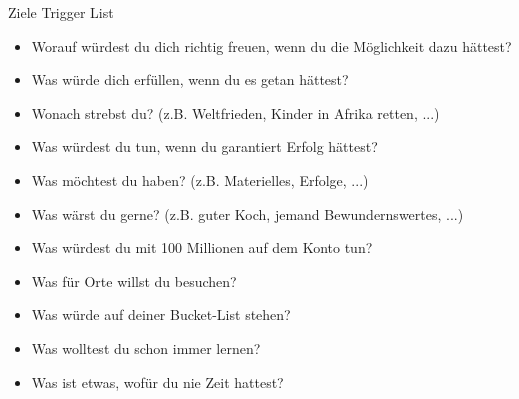 \begin{frame}[c]{Ziele Trigger List}
    \footnotesize
    \begin{itemize}
        \item Worauf würdest du dich richtig freuen, wenn du die Möglichkeit dazu hättest?
        \item Was würde dich erfüllen, wenn du es getan hättest?
        \item Wonach strebst du? (z.B. Weltfrieden, Kinder in Afrika retten, ...)
        \item Was würdest du tun, wenn du garantiert Erfolg hättest?
        \item Was möchtest du haben? (z.B. Materielles, Erfolge, ...)
        \item Was wärst du gerne? (z.B. guter Koch, jemand Bewundernswertes, ...)
        \item Was würdest du mit 100 Millionen auf dem Konto tun?
        \item Was für Orte willst du besuchen?
        \item Was würde auf deiner Bucket-List stehen?
        \item Was wolltest du schon immer lernen?
        \item Was ist etwas, wofür du nie Zeit hattest?
    \end{itemize}
\end{frame}


